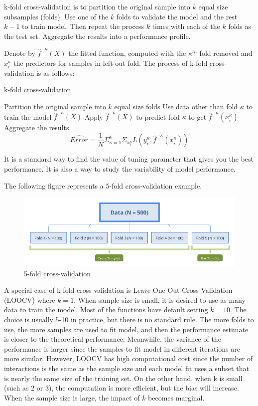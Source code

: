 \documentclass[
  12pt,
]{krantz}
\begin{document}
k-fold cross-validation is to partition the original sample into \(k\) equal size subsamples (folds). Use one of the \(k\) folds to validate the model and the rest \(k-1\) to train model. Then repeat the process \(k\) times with each of the \(k\) folds as the test set. Aggregate the results into a performance profile.

Denote by \(\hat{f}^{-\kappa}(X)\) the fitted function, computed with the \(\kappa^{th}\) fold removed and \(x_i^\kappa\) the predictors for samples in left-out fold. The process of k-fold cross-validation is as follows:

\begin{algorithm}
\caption{k-fold cross-validation}\label{kfoldcv} 
\begin{algorithmic}[1] 
\State Partition the original sample into $k$ equal size folds
      \State Use data other than fold $\kappa$ to train the model $\hat{f}^{-\kappa}(X)$
      \State Apply $\hat{f}^{-\kappa}(X)$ to predict fold $\kappa$ to get $\hat{f}^{-\kappa}(x_i^\kappa)$
\EndFor
\State Aggregate the results 
$$\hat{Error} = \frac{1}{N}\Sigma_{\kappa=1}^k\Sigma_{x_i^{\kappa}}L(y_i^{\kappa},\hat{f}^{-\kappa}(x_i^\kappa))$$
\end{algorithmic}
\end{algorithm}

It is a standard way to find the value of tuning parameter that gives you the best performance. It is also a way to study the variability of model performance.

The following figure represents a 5-fold cross-validation example.

\begin{figure}
\centering
\includegraphics{images/cv5fold.png}
\caption{5-fold cross-validation}
\end{figure}

A special case of k-fold cross-validation is Leave One Out Cross Validation (LOOCV) where \(k=1\). When sample size is small, it is desired to use as many data to train the model. Most of the functions have default setting \(k=10\). The choice is usually 5-10 in practice, but there is no standard rule. The more folds to use, the more samples are used to fit model, and then the performance estimate is closer to the theoretical performance. Meanwhile, the variance of the performance is larger since the samples to fit model in different iterations are more similar. However, LOOCV has high computational cost since the number of interactions is the same as the sample size and each model fit uses a subset that is nearly the same size of the training set. On the other hand, when k is small (such as 2 or 3), the computation is more efficient, but the bias will increase. When the sample size is large, the impact of \(k\) becomes marginal.
\end{document}
